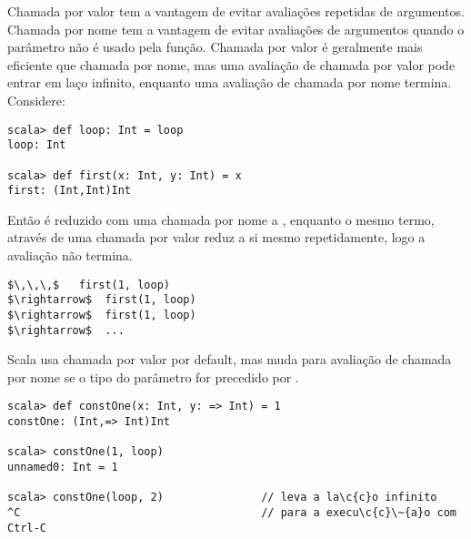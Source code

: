 Chamada por valor tem a vantagem de evitar avalia\c{c}\~{o}es repetidas de argumentos.
Chamada por nome tem a vantagem de evitar avalia\c{c}\~{o}es de argumentos quando o 
par\^{a}metro n\~{a}o \'{e} usado pela fun\c{c}\~{a}o. Chamada por valor \'{e} geralmente mais 
eficiente que chamada por nome, mas uma avalia\c{c}\~{a}o de chamada por valor
pode entrar em la\c{c}o infinito, enquanto uma avalia\c{c}\~{a}o de chamada por nome 
termina. Considere: 
\begin{lstlisting}
scala> def loop: Int = loop
loop: Int

scala> def first(x: Int, y: Int) = x
first: (Int,Int)Int
\end{lstlisting}
Ent\~{a}o  \'{e} reduzido com uma chamada por nome a ,
enquanto o mesmo termo, atrav\'{e}s de uma chamada por valor reduz a si mesmo 
repetidamente, logo a avalia\c{c}\~{a}o n\~{a}o termina.  
\begin{lstlisting}
$\,\,\,$   first(1, loop)
$\rightarrow$  first(1, loop)
$\rightarrow$  first(1, loop)
$\rightarrow$  ...
\end{lstlisting}
Scala usa chamada por valor por default, mas muda para avalia\c{c}\~{a}o de chamada por nome 
se o tipo do par\^{a}metro for precedido por \code{=>}. 
\example\ 
 
\begin{lstlisting}
scala> def constOne(x: Int, y: => Int) = 1
constOne: (Int,=> Int)Int

scala> constOne(1, loop)
unnamed0: Int = 1

scala> constOne(loop, 2)               // leva a la\c{c}o infinito
^C                                     // para a execu\c{c}\~{a}o com Ctrl-C
\end{lstlisting}


